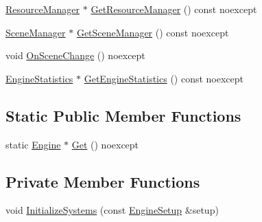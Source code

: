 \begin{DoxyCompactItemize}
\item 
\hyperlink{classmage_1_1_resource_manager}{Resource\+Manager} $\ast$ \hyperlink{classmage_1_1_engine_a8b89ee555f5208a99872d724389eba0b}{Get\+Resource\+Manager} () const noexcept
\item 
\hyperlink{classmage_1_1_scene_manager}{Scene\+Manager} $\ast$ \hyperlink{classmage_1_1_engine_adaec74f633fe6ed3a3e2ec745cd57343}{Get\+Scene\+Manager} () const noexcept
\item 
void \hyperlink{classmage_1_1_engine_a4bcc8811433865c349c8cc862d4f457d}{On\+Scene\+Change} () noexcept
\item 
\hyperlink{structmage_1_1_engine_statistics}{Engine\+Statistics} $\ast$ \hyperlink{classmage_1_1_engine_aacbd029d5e8f00e0acdb0f4d7cc04236}{Get\+Engine\+Statistics} () const noexcept
\end{DoxyCompactItemize}
\subsection*{Static Public Member Functions}
\begin{DoxyCompactItemize}
\item 
static \hyperlink{classmage_1_1_engine}{Engine} $\ast$ \hyperlink{classmage_1_1_engine_a146c8898afd978b4d1f0528128a43bbf}{Get} () noexcept
\end{DoxyCompactItemize}
\subsection*{Private Member Functions}
\begin{DoxyCompactItemize}
\item 
void \hyperlink{classmage_1_1_engine_a29a47448fb182b110d46d287a72b8b4e}{Initialize\+Systems} (const \hyperlink{structmage_1_1_engine_setup}{Engine\+Setup} \&setup)
\end{DoxyCompactItemize}
